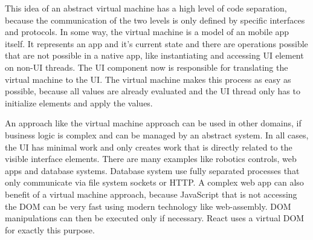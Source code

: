 This idea of an abstract virtual machine has a high level of code separation, because the communication of the two levels is only defined by specific interfaces and protocols.
In some way, the virtual machine is a model of an mobile app itself.
It represents an app and it's current state and there are operations possible that are not possible in a native app, like instantiating and accessing \ac{UI} element on non-\ac{UI} threads.
The \ac{UI} component now is responsible for translating the virtual machine to the \ac{UI}.
The virtual machine makes this process as easy as possible, because all values are already evaluated and the \ac{UI} thread only has to initialize elements and apply the values.

An approach like the virtual machine approach can be used in other domains, if business logic is complex and can be managed by an abstract system.
In all cases, the \ac{UI} has minimal work and only creates work that is directly related to the visible interface elements.
There are many examples like robotics controls, web apps and database systems.
Database system use fully separated processes that only communicate via file system sockets or \ac{HTTP}.
A complex web app can also benefit of a virtual machine approach, because JavaScript that is not accessing the \ac{DOM} can be very fast using modern technology like web-assembly.
\ac{DOM} manipulations can then be executed only if necessary.
React uses a virtual \ac{DOM} for exactly this purpose.





























